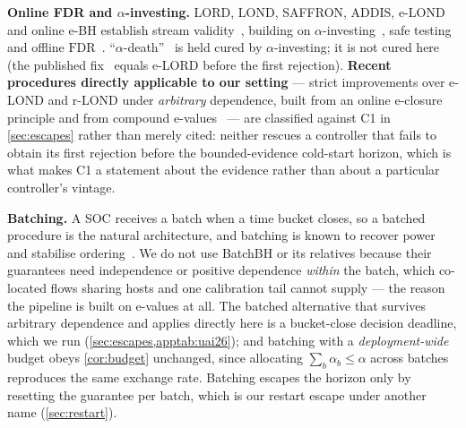 \documentclass[conference]{IEEEtran}
\newcommand{\FDR}{\mathrm{FDR}}
\begin{document}
\textbf{Online FDR and $\alpha$-investing.} LORD, LOND, SAFFRON, ADDIS, e-LOND and online e-BH
establish stream
validity~\cite{javanmard2015lond,javanmard2018lord,ramdas2017lordpp,ramdas2018saffron,tian2019addis,xu2024elond,wang2022evaluebh,fischer2025onlineebh},
building on $\alpha$-investing~\cite{foster2008alpha}, safe testing~\cite{grunwald2024safe} and offline
$\FDR$~\cite{benjamini1995controlling}. ``$\alpha$-death''~\cite{ramdas2017lordpp} is held cured by
$\alpha$-investing; it is not cured here (the published fix~\cite{egai2025} equals e-LORD before the
first rejection). \textbf{Recent procedures directly applicable to our setting} --- strict
improvements over e-LOND and r-LOND under \emph{arbitrary} dependence, built from an online e-closure
principle and from compound e-values~\cite{xu2026eclosure,xu2025closure} --- are classified against C1
in \cref{sec:escapes} rather than merely cited: neither rescues a controller that fails to obtain its
first rejection before the bounded-evidence cold-start horizon, which is what makes C1 a statement about
the evidence rather than about a particular controller's vintage.

\textbf{Batching.} A SOC receives a batch when a time bucket closes, so a batched procedure is the
natural architecture, and batching is known to recover power and stabilise
ordering~\cite{zrnic2020batching}. We do not use BatchBH or its relatives because their guarantees
need independence or positive dependence \emph{within} the batch, which co-located flows sharing hosts
and one calibration tail cannot supply --- the reason the pipeline is built on e-values at all. The
batched alternative that survives arbitrary dependence and applies directly here is a bucket-close
decision deadline,
which we run (\cref{sec:escapes,apptab:uai26}); and batching with a \emph{deployment-wide} budget obeys
\cref{cor:budget} unchanged, since allocating $\sum_b \alpha_b \le \alpha$ across batches reproduces the
same exchange rate. Batching escapes the horizon only by resetting the guarantee per batch, which is
our restart escape under another name (\cref{sec:restart}).
\end{document}
